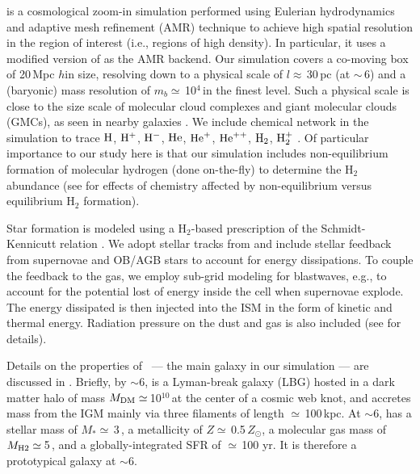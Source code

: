 \IfFileExists{emulateapjlegacy.cls}{\documentclass[iop]{emulateapjlegacy}}{\documentclass[iop]{emulateapj}}
\begin{document}
 is a cosmological zoom-in simulation performed using Eulerian hydrodynamics and
adaptive mesh refinement (AMR) technique to achieve high spatial resolution in the region of interest (i.e., regions of high density).
In particular, it uses a modified version of  \citep{Teyssier2002a} as the AMR backend.
Our simulation covers a co-moving box of 20\,Mpc $h$\pmOne in size, resolving down to a physical scale of $l\approx$\,30\,pc (at \z$\sim$\,6) and a (baryonic) mass resolution of $m_b\simeq$\,10$^4$\,\Msun in the finest level. Such a physical scale is close to the size scale of molecular cloud complexes and giant molecular clouds (GMCs), as seen in nearby galaxies \citep[e.g.,][]{Sanders85a, Federrath13a, Goodman14a}.
We include chemical network in the simulation to trace $\rm{H}$, $\rm{H}^{+}$, $\rm{H}^{-}$, $\rm{He}$, $\rm{He}^{+}$, $\rm{He}^{++}$, $\rm{H}_2$, $\rm{H}_2^{+}$ \citep{Grassi14a,Bovino16a}.
Of particular importance to our study here is that our simulation includes non-equilibrium formation of molecular hydrogen (done on-the-fly) to determine the H$_2$ abundance (see \citealt{Pallottini17b} for effects of chemistry affected by non-equilibrium versus equilibrium H$_2$ formation).

Star formation is modeled using a H$_2$-based prescription of the Schmidt-Kennicutt relation \citep{Krumholz09a}. We adopt stellar tracks from  and include stellar feedback from supernovae and OB/AGB stars to account for energy dissipations. To couple the feedback to the gas, we employ sub-grid modeling for blastwaves, e.g., to account for the potential lost of energy inside the cell when supernovae explode. The energy dissipated is then injected into the ISM in the form of kinetic and thermal energy. Radiation pressure on the dust and gas is also included (see \citealt{Pallottini17a} for details).

Details on the properties of \flower\ --- the main galaxy in our simulation --- are discussed in \citet{Pallottini17b}.
Briefly, by \z$\sim$6, \flower is a Lyman-break galaxy (LBG) hosted in a dark matter halo of mass $M_{\rm DM}\simeq$\,10$^{10}$\,\Msun at the center of a cosmic web knot, and accretes mass from the IGM mainly via three filaments of length $\simeq$\,100\,kpc. At \z$\sim$6, \flower has a stellar mass of $M_*\simeq$\,3\,\Msun, a metallicity of $Z\simeq$\,0.5\,$Z_{\odot}$, a molecular gas mass of $M_{\rm H2}\simeq$\,5\,\Msun, and a globally-integrated SFR of $\simeq$\,100\,\Msun\,yr\pmOne. It is therefore a prototypical galaxy at \z$\sim$6.
\end{document}
